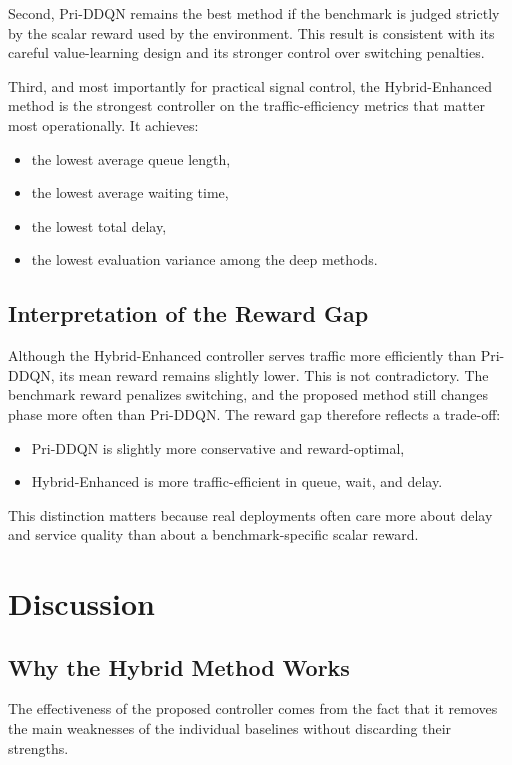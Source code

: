 \documentclass[conference]{IEEEtran}
\begin{document}
Second, Pri-DDQN remains the best method if the benchmark is judged
strictly by the scalar reward used by the environment. This result is
consistent with its careful value-learning design and its stronger
control over switching penalties.

Third, and most importantly for practical signal control, the
Hybrid-Enhanced method is the strongest controller on the
traffic-efficiency metrics that matter most operationally. It
achieves:

\begin{itemize}
\item the lowest average queue length,
\item the lowest average waiting time,
\item the lowest total delay,
\item the lowest evaluation variance among the deep methods.
\end{itemize}

\subsection{Interpretation of the Reward Gap}
Although the Hybrid-Enhanced controller serves traffic more
efficiently than Pri-DDQN, its mean reward remains slightly lower.
This is not contradictory. The benchmark reward penalizes switching,
and the proposed method still changes phase more often than Pri-DDQN.
The reward gap therefore reflects a trade-off:

\begin{itemize}
\item Pri-DDQN is slightly more conservative and reward-optimal,
\item Hybrid-Enhanced is more traffic-efficient in queue, wait, and
delay.
\end{itemize}

This distinction matters because real deployments often care more
about delay and service quality than about a benchmark-specific
scalar reward.

\section{Discussion}
\subsection{Why the Hybrid Method Works}
The effectiveness of the proposed controller comes from the fact that
it removes the main weaknesses of the individual baselines without
discarding their strengths.
\end{document}
